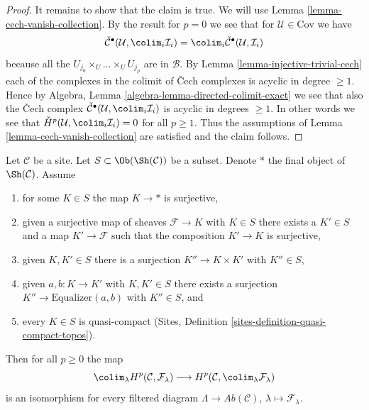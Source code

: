 \begin{proof}
\medskip\noindent
It remains to show that the claim is true. We will use
Lemma \ref{lemma-cech-vanish-collection}.
By the result for $p = 0$ we see that for $\mathcal{U} \in \text{Cov}$
we have
$$
\check{\mathcal{C}}^\bullet(\mathcal{U}, \colim_i \mathcal{I}_i)
=
\colim_i \check{\mathcal{C}}^\bullet(\mathcal{U}, \mathcal{I}_i)
$$
because all the $U_{j_0} \times_U \ldots \times_U U_{j_p}$
are in $\mathcal{B}$. By
Lemma \ref{lemma-injective-trivial-cech}
each of the complexes in the colimit of {\v C}ech complexes is
acyclic in degree $\geq 1$. Hence by
Algebra, Lemma \ref{algebra-lemma-directed-colimit-exact}
we see that also the {\v C}ech complex
$\check{\mathcal{C}}^\bullet(\mathcal{U}, \colim_i \mathcal{I}_i)$
is acyclic in degrees $\geq 1$. In other words we see that
$\check{H}^p(\mathcal{U}, \colim_i \mathcal{I}_i) = 0$
for all $p \geq 1$. Thus the assumptions of
Lemma \ref{lemma-cech-vanish-collection}
are satisfied and the claim follows.
\end{proof}

\begin{lemma}
\label{lemma-colim-global}
Let $\mathcal{C}$ be a site. Let $S \subset \Ob(\Sh(\mathcal{C}))$
be a subset. Denote $*$ the final object of $\Sh(\mathcal{C})$. Assume
\begin{enumerate}
\item for some $K \in S$ the map $K \to *$ is surjective,
\item given a surjective map of sheaves $\mathcal{F} \to K$ with $K \in S$
there exists a $K' \in S$ and a map $K' \to \mathcal{F}$ such
that the composition $K' \to K$ is surjective,
\item given $K, K' \in S$ there is a surjection $K'' \to K \times K'$
with $K'' \in S$,
\item given $a, b : K \to K'$ with $K, K' \in S$ there exists a
surjection $K'' \to \text{Equalizer}(a, b)$ with $K'' \in S$, and
\item every $K \in S$ is quasi-compact
(Sites, Definition \ref{sites-definition-quasi-compact-topos}).
\end{enumerate}
Then for all $p \geq 0$ the map
$$
\colim_\lambda H^p(\mathcal{C}, \mathcal{F}_\lambda)
\longrightarrow
H^p(\mathcal{C}, \colim_\lambda \mathcal{F}_\lambda)
$$
is an isomorphism for every filtered diagram
$\Lambda \to \textit{Ab}(\mathcal{C})$, $\lambda \mapsto \mathcal{F}_\lambda$.
\end{lemma}

